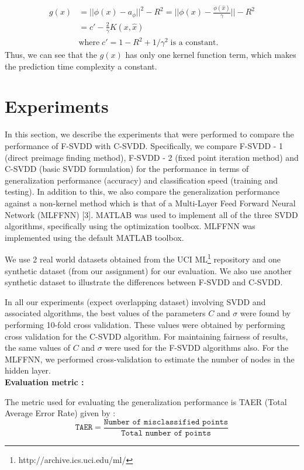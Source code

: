 \documentclass{article} %
\begin{document}
\begin{equation}
\begin{split}
g(x) &= || \phi(x) - a_\phi||^2 - R^2 = ||\phi(x) - \frac{\phi(\hat{x})}{\gamma} || - R^2 \\
 &=   c' - \frac{2}{\gamma} K(x,\hat{x}) \\
 & \text{where}\;  c' = 1- R^2 + 1/\gamma^2 \; \text{is a constant}.
\end{split}
\end{equation}
Thus, we can see that the $g(x)$ has only one kernel function term, which makes the prediction time complexity a constant. 

\section{Experiments}
In this section, we describe the experiments that were performed to compare the performance of F-SVDD with C-SVDD. Specifically, we compare F-SVDD - 1 (direct preimage finding method), F-SVDD - 2 (fixed point iteration method) and C-SVDD (basic SVDD formulation) for the performance in terms of generalization performance (accuracy) and classification speed (training and testing). In addition to this, we also compare the generalization performance against a non-kernel method which is that of a Multi-Layer Feed Forward Neural Network (MLFFNN) [3]. MATLAB was used to implement all of the three SVDD algorithms, specifically using the optimization toolbox. MLFFNN was implemented using the default MATLAB toolbox. 

We use 2 real world datasets obtained from the UCI ML\footnote{http://archive.ics.uci.edu/ml/} repository and one synthetic dataset (from our assignment) for our evaluation. We also use another synthetic dataset to illustrate the differences between F-SVDD and C-SVDD.

In all our experiments (expect overlapping dataset) involving SVDD and associated algorithms, the best values of the parameters $C$ and $\sigma$ were found by performing 10-fold cross validation. These values were obtained by performing cross validation for the C-SVDD algorithm. For maintaining fairness of results, the same values of $C$ and $\sigma$ were used for the F-SVDD algorithms also. For the MLFFNN, we performed cross-validation to estimate the number of nodes in the hidden layer. \\[5pt]


\textbf{Evaluation metric :}

The metric used for evaluating the generalization performance is  TAER (Total Average Error Rate) given by :
\[ \texttt{TAER} = \frac{\texttt{Number of misclassified points}}{\texttt{Total number of points}} \]
\end{document}
